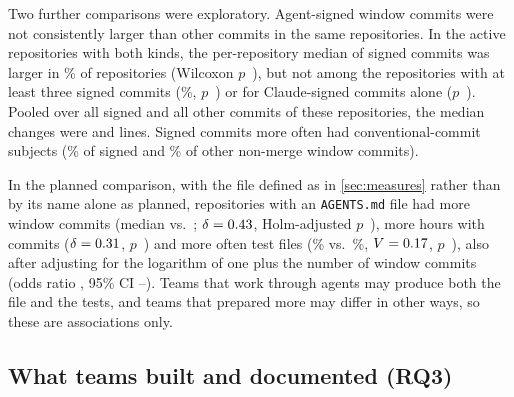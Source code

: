 \documentclass{article}
\begin{document}
Two further comparisons were exploratory. Agent-signed window commits were not consistently larger than other commits in the same repositories. In the \NRqTwoTracesCommitSizeAllRepos{} active repositories with both kinds, the per-repository median of signed commits was larger in \NRqTwoTracesCommitSizeAllSignedLargerPct\% of repositories (Wilcoxon $p$~\NRqTwoTracesCommitSizeAllP), but not among the \NRqTwoTracesCommitSizeMinThreeRepos{} repositories with at least three signed commits (\NRqTwoTracesCommitSizeMinThreeSignedLargerPct\%, $p$~\NRqTwoTracesCommitSizeMinThreeP) or for Claude-signed commits alone ($p$~\NRqTwoTracesCommitSizeClaudeP). Pooled over all signed and all other commits of these \NRqTwoTracesCommitSizePooledRepos{} repositories, the median changes were \NRqTwoTracesCommitSizePooledSigned{} and \NRqTwoTracesCommitSizePooledUnsigned{} lines. Signed commits more often had conventional-commit subjects (\NRqTwoTracesConventionalSignedPct\% of signed and \NRqTwoTracesConventionalUnsignedPct\% of other non-merge window commits).

In the planned comparison, with the file defined as in \cref{sec:measures} rather than by its name alone as planned, repositories with an \texttt{AGENTS.md} file had more window commits (median \NRqTwoTracesAgentsMdAssocCommitsWith{} vs.\ \NRqTwoTracesAgentsMdAssocCommitsWithout; $\delta = \num{0.43}$, Holm-adjusted $p$~\NRqTwoTracesAgentsMdAssocCommitsP), more hours with commits ($\delta = \num{0.31}$, $p$~\NRqTwoTracesAgentsMdAssocHoursP) and more often test files (\NRqTwoTracesAgentsMdAssocTestsWith\% vs.\ \NRqTwoTracesAgentsMdAssocTestsWithout\%, $V = \num{0.17}$, $p$~\NRqTwoTracesAgentsMdAssocTestsP), also after adjusting for the logarithm of one plus the number of window commits (odds ratio \NRqTwoTracesAgentsMdAssocTestsAdjustedOr, 95\% CI \NRqTwoTracesAgentsMdAssocTestsAdjustedLo--\NRqTwoTracesAgentsMdAssocTestsAdjustedHi). Teams that work through agents may produce both the file and the tests, and teams that prepared more may differ in other ways, so these are associations only.

\subsection{What teams built and documented (RQ3)}\label{sec:product}
\end{document}
